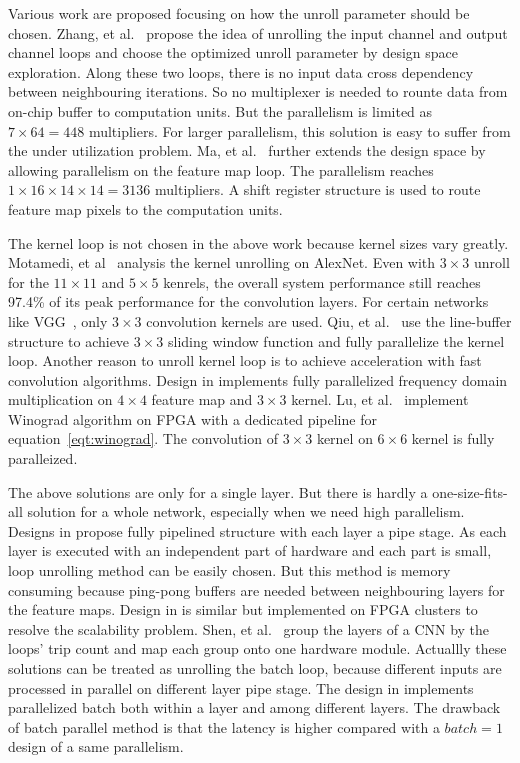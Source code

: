 Various work are proposed focusing on how the unroll parameter should be chosen. Zhang, et al.~\cite{zhang2015optimizing} propose the idea of unrolling the input channel and output channel loops and choose the optimized unroll parameter by design space exploration. Along these two loops, there is no input data cross dependency between neighbouring iterations. So no multiplexer is needed to rounte data from on-chip buffer to computation units. But the parallelism is limited as $7\times 64=448$ multipliers. For larger parallelism, this solution is easy to suffer from the under utilization problem. Ma, et al.~\cite{ma2017optimizing} further extends the design space by allowing parallelism on the feature map loop. The parallelism reaches $1\times 16\times 14\times 14=3136$ multipliers. A shift register structure is used to route feature map pixels to the computation units.

The kernel loop is not chosen in the above work because kernel sizes vary greatly. Motamedi, et al~\cite{motamedi2016design} analysis the kernel unrolling on AlexNet. Even with $3\times 3$ unroll for the $11\times 11$ and $5\times 5$ kenrels, the overall system performance still reaches 97.4\% of its peak performance for the convolution layers. For certain networks like VGG~\cite{simonyan2014very}, only $3\times 3$ convolution kernels are used.  Qiu, et al.~\cite{qiu2016going} use the line-buffer structure to achieve $3\times 3$ sliding window function and fully parallelize the kernel loop. Another reason to unroll kernel loop is to achieve acceleration with fast convolution algorithms. Design in \cite{zhang2017frequency} implements fully parallelized frequency domain multiplication on $4\times 4$ feature map and $3\times 3$ kernel. Lu, et al.~\cite{lu2017evaluating} implement Winograd algorithm on FPGA with a dedicated pipeline for equation~\ref{eqt:winograd}. The convolution of $3\times 3$ kernel on $6\times 6$ kernel is fully paralleized.

The above solutions are only for a single layer. But there is hardly a one-size-fits-all solution for a whole network, especially when we need high parallelism. Designs in \cite{li2016high, liu2016automatic} propose fully pipelined structure with each layer a pipe stage. As each layer is executed with an independent part of hardware and each part is small, loop unrolling method can be easily chosen. But this method is memory consuming because ping-pong buffers are needed between neighbouring layers for the feature maps. Design in \cite{zhang2016energy} is similar but implemented on FPGA clusters to resolve the scalability problem. Shen, et al.~\cite{shen2016overcoming} group the layers of a CNN by the loops' trip count and map each group onto one hardware module. Actuallly these solutions can be treated as unrolling the batch loop, because different inputs are processed in parallel on different layer pipe stage. The design in \cite{lu2017evaluating} implements parallelized batch both within a layer and among different layers. The drawback of batch parallel method is that the latency is higher compared with a $batch=1$ design of a same parallelism.

